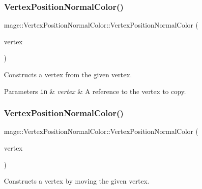 \subsubsection{\texorpdfstring{Vertex\+Position\+Normal\+Color()}{VertexPositionNormalColor()}\hspace{0.1cm}{\footnotesize\ttfamily [3/4]}}
{\footnotesize\ttfamily mage\+::\+Vertex\+Position\+Normal\+Color\+::\+Vertex\+Position\+Normal\+Color (\begin{DoxyParamCaption}\item[{const \hyperlink{structmage_1_1_vertex_position_normal_color}{Vertex\+Position\+Normal\+Color} \&}]{vertex }\end{DoxyParamCaption})\hspace{0.3cm}{\ttfamily [default]}}

Constructs a vertex from the given vertex.


\begin{DoxyParams}[1]{Parameters}
\mbox{\tt in}  & {\em vertex} & A reference to the vertex to copy. \\
\hline
\end{DoxyParams}
\hypertarget{structmage_1_1_vertex_position_normal_color_aa2576c4e552f638bab84a715d1b53ea3}{}\label{structmage_1_1_vertex_position_normal_color_aa2576c4e552f638bab84a715d1b53ea3} 
\subsubsection{\texorpdfstring{Vertex\+Position\+Normal\+Color()}{VertexPositionNormalColor()}\hspace{0.1cm}{\footnotesize\ttfamily [4/4]}}
{\footnotesize\ttfamily mage\+::\+Vertex\+Position\+Normal\+Color\+::\+Vertex\+Position\+Normal\+Color (\begin{DoxyParamCaption}\item[{\hyperlink{structmage_1_1_vertex_position_normal_color}{Vertex\+Position\+Normal\+Color} \&\&}]{vertex }\end{DoxyParamCaption})\hspace{0.3cm}{\ttfamily [default]}}

Constructs a vertex by moving the given vertex.


